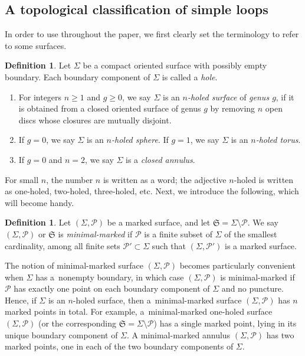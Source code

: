 \documentclass[10pt,a4paper]{amsart}
\numberwithin{equation}{section}
\theoremstyle{definition}
\newtheorem{Definition}[Theorem]{Definition}
\begin{document}
\subsection{A topological classification of simple loops}
\label{subsec:topological_classification_of_simple_loops}
In order to use throughout the paper, we first clearly set the terminology to refer to some surfaces.
\begin{Definition}
\label{def:surface_terminology}
Let $\Sigma$ be a compact oriented surface with possibly empty boundary. Each boundary component of $\Sigma$ is called a {\em hole}.
\begin{enumerate}[label={\rm (\arabic*)}]\itemsep=0pt
\item For integers $n\ge 1$ and $g\ge 0$, we say $\Sigma$ is an {\em $n$-holed surface} of {\em genus $g$}, if it is obtained from a closed oriented surface of genus $g$ by removing $n$ open discs whose closures are mutually disjoint.
\item If $g=0$, we say $\Sigma$ is an {\em $n$-holed sphere}. If $g=1$, we say $\Sigma$ is an {\em $n$-holed torus}.
\item If $g=0$ and $n=2$, we say $\Sigma$ is a {\em closed annulus}.
\end{enumerate}
\end{Definition}
For small $n$, the number $n$ is written as a word; the adjective $n$-holed is written as one-holed, two-holed, three-holed, etc. Next, we introduce the following, which will become handy.
\begin{Definition}
\label{def:minimal-marked}
Let $(\Sigma,\mathcal{P})$ be a marked surface, and let $\mathfrak{S} = \Sigma\setminus\mathcal{P}$. We say $(\Sigma,\mathcal{P})$ or $\mathfrak{S}$ is {\em minimal-marked} if $\mathcal{P}$ is a finite subset of $\Sigma$ of the smallest cardinality, among all finite sets $\mathcal{P}' \subset \Sigma$ such that $(\Sigma,\mathcal{P}')$ is a marked surface.
\end{Definition}
The notion of minimal-marked surface $(\Sigma,\mathcal{P})$ becomes particularly convenient when $\Sigma$ has a~nonempty boundary, in which case $(\Sigma,\mathcal{P})$ is minimal-marked if $\mathcal{P}$ has exactly one point on each boundary component of $\Sigma$ and no puncture. Hence, if $\Sigma$ is an $n$-holed surface, then a~minimal-marked surface $(\Sigma,\mathcal{P})$ has $n$ marked points in total. For example, a~minimal-marked one-holed surface $(\Sigma,\mathcal{P})$ (or the corresponding $\mathfrak{S} = \Sigma\setminus\mathcal{P}$) has a single marked point, lying in its unique boundary component of $\Sigma$. A minimal-marked annulus $(\Sigma, \mathcal{P})$ has two marked points, one in each of the two boundary components of $\Sigma$.
\end{document}

